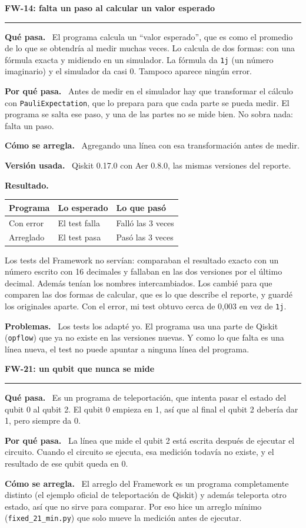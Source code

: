 \documentclass[11pt,a4paper]{article}
\newcommand{\paper}[1]{\vspace{1.2em}\par{\large\textbf{#1}}\par\vspace{0.2em}\hrule\vspace{0.4em}}
\newcommand{\parte}[1]{\par\textbf{#1.}\ }
\newcommand{\resultados}[1]{%
\begin{center}
\begin{tabular}{lll}
\toprule
Programa & Lo esperado & Lo que pasó \\
\midrule
Con error & El test falla & Falló las 3 veces \\
Arreglado & El test pasa & Pasó las 3 veces \\
\bottomrule
\end{tabular}
\end{center}}
\begin{document}
\paper{FW-14: falta un paso al calcular un valor esperado}

\parte{Qué pasa}
El programa calcula un ``valor esperado'', que es como el promedio de lo que se obtendría al medir muchas veces. Lo calcula de dos formas: con una fórmula exacta y midiendo en un simulador. La fórmula da \texttt{1j} (un número imaginario) y el simulador da casi 0. Tampoco aparece ningún error.

\parte{Por qué pasa}
Antes de medir en el simulador hay que transformar el cálculo con \texttt{PauliExpectation}, que lo prepara para que cada parte se pueda medir. El programa se salta ese paso, y una de las partes no se mide bien. No sobra nada: falta un paso.

\parte{Cómo se arregla}
Agregando una línea con esa transformación antes de medir.

\parte{Versión usada}
Qiskit 0.17.0 con Aer 0.8.0, las mismas versiones del reporte.

\parte{Resultado}
\resultados{14}
Los tests del Framework no servían: comparaban el resultado exacto con un número escrito con 16 decimales y fallaban en las dos versiones por el último decimal. Además tenían los nombres intercambiados. Los cambié para que comparen las dos formas de calcular, que es lo que describe el reporte, y guardé los originales aparte. Con el error, mi test obtuvo cerca de 0,003 en vez de \texttt{1j}.

\parte{Problemas}
Los tests los adapté yo. El programa usa una parte de Qiskit (\texttt{opflow}) que ya no existe en las versiones nuevas. Y como lo que falta es una línea nueva, el test no puede apuntar a ninguna línea del programa.

\paper{FW-21: un qubit que nunca se mide}

\parte{Qué pasa}
Es un programa de teleportación, que intenta pasar el estado del qubit 0 al qubit 2. El qubit 0 empieza en 1, así que al final el qubit 2 debería dar 1, pero siempre da 0.

\parte{Por qué pasa}
La línea que mide el qubit 2 está escrita después de ejecutar el circuito. Cuando el circuito se ejecuta, esa medición todavía no existe, y el resultado de ese qubit queda en 0.

\parte{Cómo se arregla}
El arreglo del Framework es un programa completamente distinto (el ejemplo oficial de teleportación de Qiskit) y además teleporta otro estado, así que no sirve para comparar. Por eso hice un arreglo mínimo (\texttt{fixed\_21\_min.py}) que solo mueve la medición antes de ejecutar.
\end{document}
